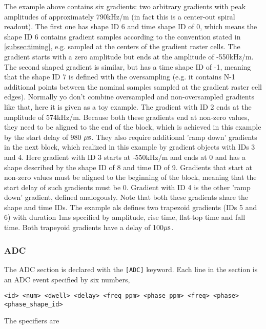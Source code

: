 \documentclass{article}
\begin{document}
The example above contains six gradients: two arbitrary gradients with peak amplitudes of approximately 790kHz/m (in fact this is a center-out spiral readout). The first one has shape ID 6 and time shape ID of 0, which means the shape ID 6 contains gradient samples according to the convention stated in \autoref{subsec:timing}, e.g. sampled at the centers of the gradient raster cells. The gradient starts with a zero amplitude but ends at the amplitude of -550kHz/m. The second shaped gradient is similar, but has a time shape ID of -1, meaning that the shape ID 7 is defined with the oversampling (e.g. it contains N-1 additional points between the nominal samples sampled at the gradient raster cell edges). Normally yo don't combine oversampled and non-oversampled gradients like that, here it is given as a toy example. The gradient with ID 2 ends at the amplitude of 574kHz/m. Because both these gradients end at non-zero values, they need to be aligned to the end of the block, which is achieved in this example by the start delay of 980 $\rm \mu s$. They also require additional 'ramp down' gradients in the next block, which realized in this example by gradient objects with IDs 3 and 4. Here gradient with ID 3 starts at -550kHz/m and ends at 0 and has a shape described by the shape ID of 8 and time ID of 9. Gradients that start at non-zero values must be aligned to the beginning of the block, meaning that the start delay of such gradients must be 0. Gradient with ID 4 is the other 'ramp down' gradient, defined analogously. Note that both these gradients share the shape and time IDs. The example als defines two trapezoid gradients (IDs 5 and 6) with duration 1ms specified by amplitude, rise time, flat-top time and fall time.
Both trapeyoid gradients have a delay of 100$\rm \mu s$.

\subsubsection{ADC}
The ADC section is declared with the \verb.[ADC]. keyword. Each line in the section is an ADC event specified by six numbers,
\begin{lstlisting}
<id> <num> <dwell> <delay> <freq_ppm> <phase_ppm> <freq> <phase> <phase_shape_id>
\end{lstlisting}

The specifiers are
\end{document}
